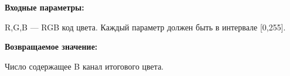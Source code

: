 \textbf{Входные параметры:}  

R,G,B --- RGB код цвета. Каждый параметр должен быть в интервале [0,255].

\textbf{Возвращаемое значение:}

Число содержащее B канал итогового цвета.